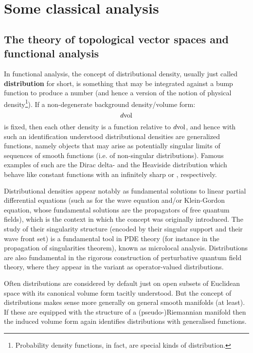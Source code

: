 \section{Some classical analysis}
    \subsection{The theory of topological vector spaces and functional analysis}
        In functional analysis, the concept of distributional density, usually just called \textbf{distribution} for short, is something that may be integrated against a bump function to produce a number (and hence a  version of the notion of physical density\footnote{Probability density functions, in fact, are special kinds of distribution.}). If a non-degenerate background density/volume form:
            $$d\mathrm{vol}$$
        is fixed, then each other density is a function relative to $d\mathrm{vol}$, and hence with such an identification understood distributional densities are generalized functions, namely objects that may arise as potentially singular limits of sequences of smooth functions (i.e. of non-singular distributions). Famous examples of such are the Dirac delta- and the Heaviside distribution which behave like constant functions with an infinitely sharp  or , respectively.

        Distributional densities appear notably as fundamental solutions to linear partial differential equations (such as for the wave equation and/or Klein-Gordon equation, whose fundamental solutions are the propagators of free quantum fields), which is the context in which the concept was originally introduced. The study of their singularity structure (encoded by their singular support and their wave front set) is a fundamental tool in PDE theory (for instance in the propagation of singularities theorem), known as microlocal analysis. Distributions are also fundamental in the rigorous construction of perturbative quantum field theory, where they appear in the variant as operator-valued distributions.
        
        Often distributions are considered by default just on open subsets of Euclidean space with its canonical volume form tacitly understood. But the concept of distributions makes sense more generally on general smooth manifolds (at least). If these are equipped with the structure of a (pseudo-)Riemannian manifold then the induced volume form again identifies distributions with generalised functions.
        
